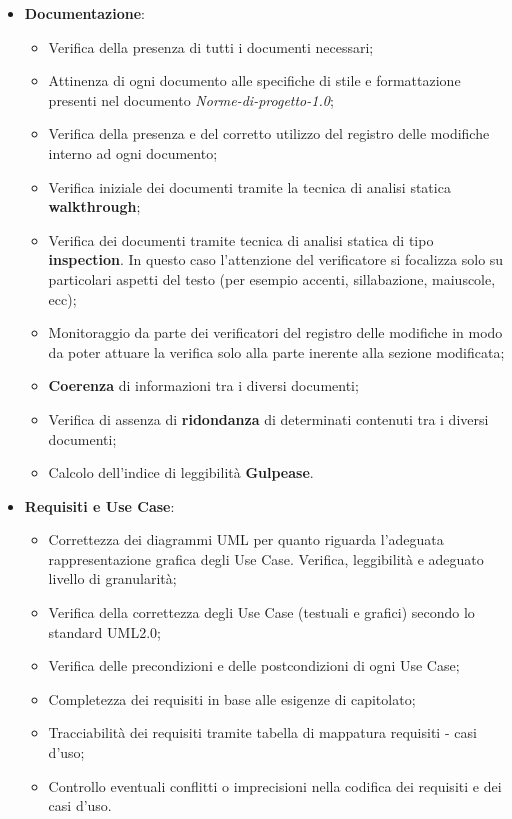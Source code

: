 \documentclass[a4paper,11pt]{article}
\begin{document}
\begin{itemize}
\item \textbf{Documentazione}:
\begin{itemize}
\item Verifica della presenza di tutti i documenti necessari;
\item Attinenza di ogni documento alle specifiche di stile e formattazione presenti nel documento \textit{Norme-di-progetto-1.0};
\item Verifica della presenza e del corretto utilizzo del registro delle modifiche interno ad ogni documento;
\item Verifica iniziale dei documenti tramite la tecnica di analisi statica \textbf{walkthrough};
\item Verifica dei documenti tramite tecnica di analisi statica di tipo \textbf{inspection}. In questo caso l'attenzione del verificatore si focalizza solo su particolari aspetti del testo (per esempio accenti, sillabazione, maiuscole, ecc);
\item Monitoraggio da parte dei verificatori del registro delle modifiche in modo da poter attuare la verifica solo alla parte inerente alla sezione modificata;
\item \textbf{Coerenza} di informazioni tra i diversi documenti;
\item Verifica di assenza di \textbf{ridondanza} di determinati contenuti tra i diversi documenti;
\item Calcolo dell'indice di leggibilità \textbf{Gulpease}.
\end{itemize}
\item \textbf{Requisiti e Use Case}: 
\begin{itemize}
\item Correttezza dei diagrammi UML per quanto riguarda l'adeguata rappresentazione grafica degli Use Case. Verifica, leggibilità e adeguato livello di granularità;
\item Verifica della correttezza degli Use Case (testuali e grafici) secondo lo standard UML2.0;
\item Verifica delle precondizioni e delle postcondizioni di ogni Use Case;
\item Completezza dei requisiti in base alle esigenze di capitolato;
\item Tracciabilità dei requisiti tramite tabella di mappatura requisiti - casi d'uso;
\item Controllo eventuali conflitti o imprecisioni nella codifica dei requisiti e dei casi d'uso.
\end{itemize}
 

\end{itemize}
\end{document}

